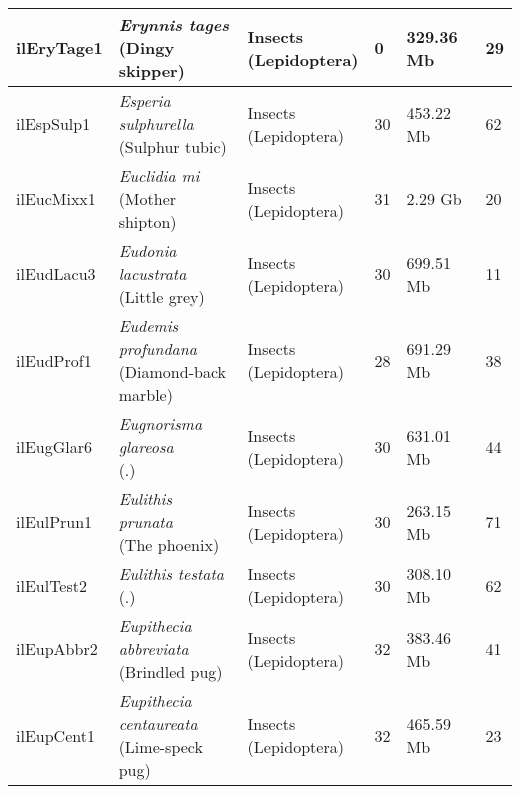 \begin{centering}
\begin{longtable}{l|l|l|l|l|l}
ilEryTage1 & \makecell[{l}]{\textit{Erynnis tages} \\ (Dingy skipper)} & \makecell[{l}]{Insects \\ (Lepidoptera)} & 0 & 329.36 Mb & 29  \\ \hline
ilEspSulp1 & \makecell[{l}]{\textit{Esperia sulphurella} \\ (Sulphur tubic)} & \makecell[{l}]{Insects \\ (Lepidoptera)} & 30 & 453.22 Mb & 62  \\ \hline
ilEucMixx1 & \makecell[{l}]{\textit{Euclidia mi} \\ (Mother shipton)} & \makecell[{l}]{Insects \\ (Lepidoptera)} & 31 & 2.29 Gb & 20  \\ \hline
ilEudLacu3 & \makecell[{l}]{\textit{Eudonia lacustrata} \\ (Little grey)} & \makecell[{l}]{Insects \\ (Lepidoptera)} & 30 & 699.51 Mb & 11  \\ \hline
ilEudProf1 & \makecell[{l}]{\textit{Eudemis profundana} \\ (Diamond-back marble)} & \makecell[{l}]{Insects \\ (Lepidoptera)} & 28 & 691.29 Mb & 38  \\ \hline
ilEugGlar6 & \makecell[{l}]{\textit{Eugnorisma glareosa} \\ (.)} & \makecell[{l}]{Insects \\ (Lepidoptera)} & 30 & 631.01 Mb & 44  \\ \hline
ilEulPrun1 & \makecell[{l}]{\textit{Eulithis prunata} \\ (The phoenix)} & \makecell[{l}]{Insects \\ (Lepidoptera)} & 30 & 263.15 Mb & 71  \\ \hline
ilEulTest2 & \makecell[{l}]{\textit{Eulithis testata} \\ (.)} & \makecell[{l}]{Insects \\ (Lepidoptera)} & 30 & 308.10 Mb & 62  \\ \hline
ilEupAbbr2 & \makecell[{l}]{\textit{Eupithecia abbreviata} \\ (Brindled pug)} & \makecell[{l}]{Insects \\ (Lepidoptera)} & 32 & 383.46 Mb & 41  \\ \hline
ilEupCent1 & \makecell[{l}]{\textit{Eupithecia centaureata} \\ (Lime-speck pug)} & \makecell[{l}]{Insects \\ (Lepidoptera)} & 32 & 465.59 Mb & 23  \\ \hline

\end{longtable}
\end{centering}
